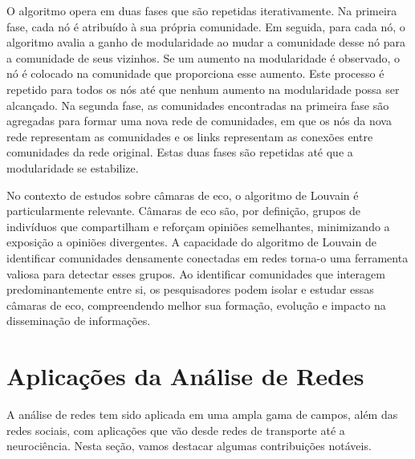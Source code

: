 O algoritmo opera em duas fases que são repetidas iterativamente. Na primeira fase, cada nó é atribuído à sua própria comunidade. Em seguida, para cada nó, o algoritmo avalia a ganho de modularidade ao mudar a comunidade desse nó para a comunidade de seus vizinhos. Se um aumento na modularidade é observado, o nó é colocado na comunidade que proporciona esse aumento. Este processo é repetido para todos os nós até que nenhum aumento na modularidade possa ser alcançado. Na segunda fase, as comunidades encontradas na primeira fase são agregadas para formar uma nova rede de comunidades, em que os nós da nova rede representam as comunidades e os links representam as conexões entre comunidades da rede original. Estas duas fases são repetidas até que a modularidade se estabilize.

No contexto de estudos sobre câmaras de eco, o algoritmo de Louvain é particularmente relevante. Câmaras de eco são, por definição, grupos de indivíduos que compartilham e reforçam opiniões semelhantes, minimizando a exposição a opiniões divergentes. A capacidade do algoritmo de Louvain de identificar comunidades densamente conectadas em redes torna-o uma ferramenta valiosa para detectar esses grupos. Ao identificar comunidades que interagem predominantemente entre si, os pesquisadores podem isolar e estudar essas câmaras de eco, compreendendo melhor sua formação, evolução e impacto na disseminação de informações.

\section{Aplicações da Análise de Redes}

A análise de redes tem sido aplicada em uma ampla gama de campos, além das redes sociais, com aplicações que vão desde redes de transporte até a neurociência. Nesta seção, vamos destacar algumas contribuições notáveis.

